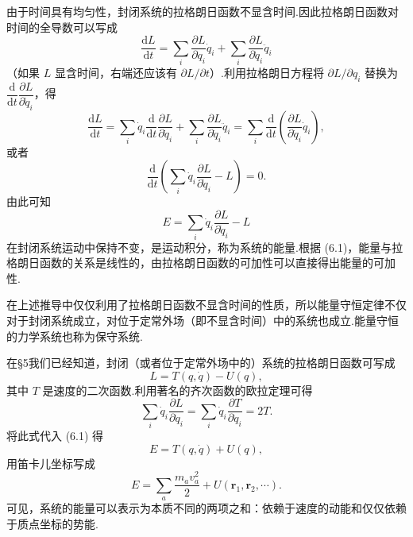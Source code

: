 由于时间具有均匀性，封闭系统的拉格朗日函数不显含时间.因此拉格朗日函数对时间的全导数可以写成
\begin{equation*}
  \frac{\mathrm{d}L}{\mathrm{d}t}
  =\sum_i\frac{\partial L}{\partial q_i}\dot{q}_i
  +\sum_i\frac{\partial L}{\partial\dot{q}_i}\ddot{q}_i
\end{equation*}
（如果 $L$ 显含时间，右端还应该有 $\partial L/\partial t$）.利用拉格朗日方程将 $\partial L/\partial q_i$ 替换为 $\dfrac{\mathrm{d}}{\mathrm{d}t}\dfrac{\partial L}{\partial\dot{q}_i}$，得
\begin{equation*}
  \frac{\mathrm{d}L}{\mathrm{d}t}
  =\sum_i\dot{q}_i\frac{\mathrm{d}}{\mathrm{d}t}\frac{\partial L}{\partial\dot{q}_i}
  +\sum_i\frac{\partial L}{\partial\dot{q}_i}\ddot{q}_i
  =\sum_i\frac{\mathrm{d}}{\mathrm{d}t}\left(\frac{\partial L}{\partial\dot{q}_i}\dot{q}_i\right),
\end{equation*}
或者
\begin{equation*}
  \frac{\mathrm{d}}{\mathrm{d}t}\left(\sum_i\dot{q}_i
  \frac{\partial L}{\partial\dot{q}_i}-L\right)=0.
\end{equation*}
由此可知
\begin{equation}
  E=\sum_i\dot{q}_i\frac{\partial L}{\partial\dot{q}_i}-L
\end{equation}
在封闭系统运动中保持不变，是运动积分，称为系统的能量.根据 (6.1)，能量与拉格朗日函数的关系是线性的，由拉格朗日函数的可加性可以直接得出能量的可加性.

在上述推导中仅仅利用了拉格朗日函数不显含时间的性质，所以能量守恒定律不仅对于封闭系统成立，对位于定常外场（即不显含时间）中的系统也成立.能量守恒的力学系统也称为保守系统.

在§5我们已经知道，封闭（或者位于定常外场中的）系统的拉格朗日函数可写成
\begin{equation*}
  L=T(q,\dot{q})-U(q),
\end{equation*}
其中 $T$ 是速度的二次函数.利用著名的齐次函数的欧拉定理可得
\begin{equation*}
  \sum_i\dot{q}_i\frac{\partial L}{\partial\dot{q}_i}
  =\sum_i\dot{q}_i\frac{\partial T}{\partial\dot{q}_i}=2T.
\end{equation*}
将此式代入 (6.1) 得
\begin{equation}
  E=T(q,\dot{q})+U(q),
\end{equation}
用笛卡儿坐标写成
\begin{equation}
  E=\sum_a\frac{m_a v_a^2}{2}+U(\boldsymbol{r}_1,\boldsymbol{r}_2,\cdots).
\end{equation}
可见，系统的能量可以表示为本质不同的两项之和：依赖于速度的动能和仅仅依赖于质点坐标的势能.


